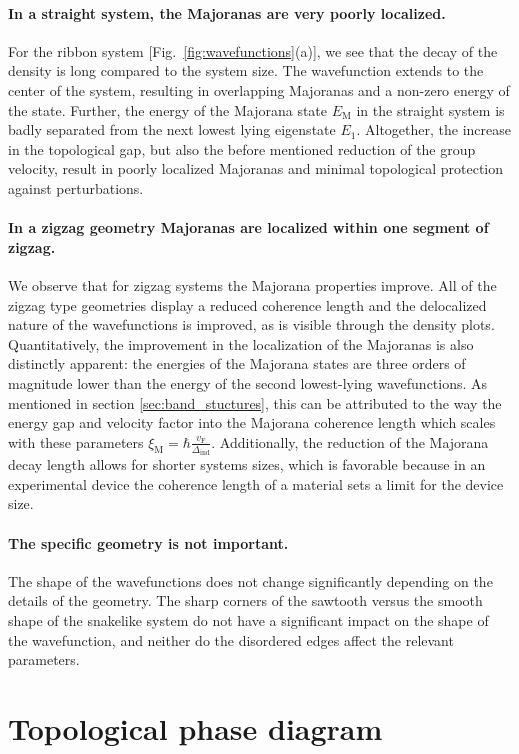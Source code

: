 \documentclass[english, twocolumn, 10pt, aps, superscriptaddress, floatfix, prb, citeautoscript]{revtex4-1}
\renewcommand{\comment}[2]{#2}
\renewcommand{\comment}{\paragraph}
\begin{document}
\comment{In a straight system, the Majoranas are very poorly localized.}
For the ribbon system [Fig.~\ref{fig:wavefunctions}(a)], we see that the decay of the density is long compared to the system size.
The wavefunction extends to the center of the system, resulting in overlapping Majoranas and a non-zero energy of the state.
Further, the energy of the Majorana state $E_\textrm{M}$ in the straight system is badly separated from the next lowest lying eigenstate $E_1$.
Altogether, the increase in the topological gap, but also the before mentioned reduction of the group velocity, result in poorly localized Majoranas and minimal topological protection against perturbations.  %

\comment{In a zigzag geometry Majoranas are localized within one segment of zigzag.}
We observe that for zigzag systems the Majorana properties improve.
All of the zigzag type geometries display a reduced coherence length and the delocalized nature of the wavefunctions is improved, as is visible through the density plots.
Quantitatively, the improvement in the localization of the Majoranas is also distinctly apparent: the energies of the Majorana states are three orders of magnitude lower than the energy of the second lowest-lying wavefunctions.
As mentioned in section \ref{sec:band_stuctures}, this can be attributed to the way the energy gap and velocity factor into the Majorana coherence length which scales with these parameters $\xi_\textrm{M}=\hbar\frac{v_\textrm{F}}{\Delta_\textrm{ind}}$.
Additionally, the reduction of the Majorana decay length allows for shorter systems sizes, which is favorable because in an experimental device the coherence length of a material sets a limit for the device size.

\comment{The specific geometry is not important.}
The shape of the wavefunctions does not change significantly depending on the details of the geometry.
The sharp corners of the sawtooth versus the smooth shape of the snakelike system do not have a significant impact on the shape of the wavefunction, and neither do the disordered edges affect the relevant parameters.

\section{Topological phase diagram}
\end{document}
